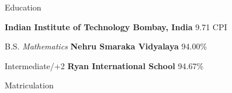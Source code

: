 \begin{rubric}{Education}

\entry*[2018 -- 2021*]%
	\textbf{Indian Institute of Technology Bombay, India} \hfill 9.71 CPI
	\par B.S. \emph{Mathematics}
\entry*[2016 -- 2018]%
	\textbf{Nehru Smaraka Vidyalaya} \hfill 94.00\% \par
	Intermediate/+2
\entry*[\hphantom{2010 --} 2016]%
	\textbf{Ryan International School} \hfill 94.67\% \par
	Matriculation
\end{rubric}